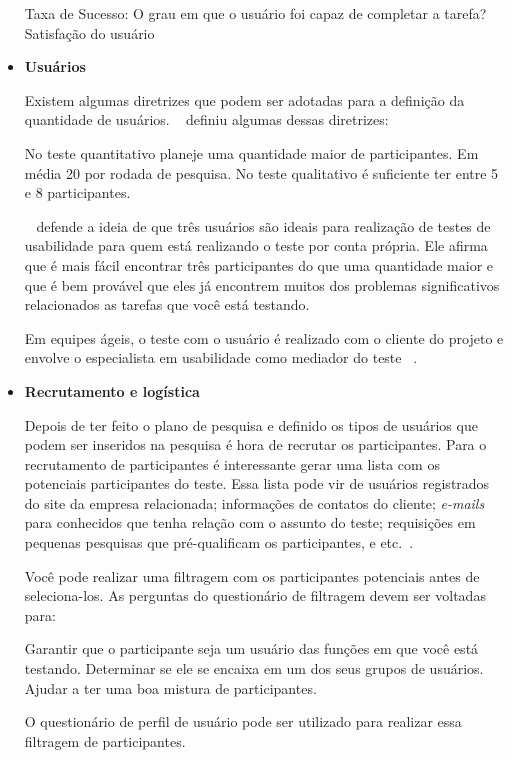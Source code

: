 \begin{itemize}
	\subitem Taxa de Sucesso: O grau em que o usuário foi capaz de completar a tarefa?
		\subitem Satisfação do usuário


\item \textbf{Usuários}

Existem algumas diretrizes que podem ser adotadas para a definição da quantidade de usuários. ~ definiu algumas dessas diretrizes:


\subitem No teste quantitativo planeje uma quantidade maior de participantes. Em média 20 por rodada de pesquisa.
\subitem No teste qualitativo é suficiente ter entre 5 e 8 participantes.


	 ~ defende a ideia de que três usuários são ideais para realização de testes de usabilidade para quem está realizando o teste por conta própria. Ele afirma que é mais fácil encontrar três participantes do que uma quantidade maior e que é bem provável que eles já encontrem muitos dos problemas significativos relacionados as tarefas que você está testando.

	Em equipes ágeis, o teste com o usuário é realizado com o cliente do projeto e envolve o especialista em usabilidade como mediador do teste ~\cite{santos2012}.

\item \textbf{Recrutamento e logística}

Depois de ter feito o plano de pesquisa e definido os tipos de usuários que podem ser inseridos na pesquisa é hora de recrutar os participantes.
Para o recrutamento de participantes é interessante gerar uma lista com os potenciais participantes do teste. Essa lista pode vir de usuários registrados do site da empresa relacionada; informações de contatos do cliente; \textit{e-mails} para conhecidos que tenha relação com o assunto do teste; requisições em pequenas pesquisas que pré-qualificam os participantes, e etc.~\cite{unger2009}.

Você pode realizar uma filtragem com os participantes potenciais antes de seleciona-los. As perguntas do questionário de filtragem devem ser voltadas para:

	
	\subitem Garantir que o participante seja um usuário das funções em que você está testando.
	\subitem Determinar se ele se encaixa em um dos seus grupos de usuários.
	\subitem Ajudar a ter uma boa mistura de participantes.
	

O questionário de perfil de usuário pode ser utilizado para realizar essa filtragem de participantes.



\end{itemize}
